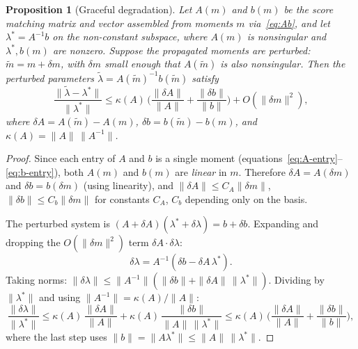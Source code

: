 \documentclass[10pt,a4paper]{amsart}
\newtheorem{proposition}{Proposition}
\begin{document}
\begin{proposition}[Graceful degradation]\label{prop:graceful}
Let $A(m)$ and $b(m)$ be the score matching matrix and vector
assembled from moments $m$ via~\eqref{eq:Ab},
and let $\lambda^* = A^{-1}b$ on the non-constant subspace, where
$A(m)$ is nonsingular and $\lambda^*, b(m)$ are nonzero.
Suppose the propagated moments are perturbed:
$\tilde{m} = m + \delta m$, with $\delta m$ small enough that
$A(\tilde m)$ is also nonsingular.
Then the perturbed parameters $\tilde{\lambda} = A(\tilde{m})^{-1} b(\tilde{m})$
satisfy
\begin{equation}
    \frac{\|\tilde\lambda - \lambda^*\|}{\|\lambda^*\|}
    \le \kappa(A)\,
    \biggl(\frac{\|\delta A\|}{\|A\|} + \frac{\|\delta b\|}{\|b\|}\biggr)
    + O(\|\delta m\|^2),
\end{equation}
where $\delta A = A(\tilde{m}) - A(m)$,
$\delta b = b(\tilde{m}) - b(m)$,
and $\kappa(A) = \|A\|\,\|A^{-1}\|$.
\end{proposition}

\begin{proof}
Since each entry of $A$ and $b$ is a single moment
(equations~\eqref{eq:A-entry}--\eqref{eq:b-entry}),
both $A(m)$ and $b(m)$ are \emph{linear} in $m$.
Therefore $\delta A = A(\delta m)$ and $\delta b = b(\delta m)$
(using linearity), and
$\|\delta A\| \le C_A \|\delta m\|$,
$\|\delta b\| \le C_b \|\delta m\|$
for constants $C_A$, $C_b$ depending only on the basis.

The perturbed system is $(A + \delta A)(\lambda^* + \delta\lambda) = b + \delta b$.
Expanding and dropping the $O(\|\delta m\|^2)$ term $\delta A \cdot \delta\lambda$:
\begin{equation}
    \delta\lambda = A^{-1}(\delta b - \delta A\, \lambda^*).
\end{equation}
Taking norms:
$\|\delta\lambda\| \le \|A^{-1}\|(\|\delta b\| + \|\delta A\|\,\|\lambda^*\|)$.
Dividing by $\|\lambda^*\|$ and using $\|A^{-1}\| = \kappa(A)/\|A\|$:
\begin{equation}
    \frac{\|\delta\lambda\|}{\|\lambda^*\|}
    \le \kappa(A)\,\frac{\|\delta A\|}{\|A\|}
    + \kappa(A)\,\frac{\|\delta b\|}{\|A\|\,\|\lambda^*\|}
    \le \kappa(A)\,
    \biggl(\frac{\|\delta A\|}{\|A\|} + \frac{\|\delta b\|}{\|b\|}\biggr),
\end{equation}
where the last step uses $\|b\| = \|A\lambda^*\| \le \|A\|\,\|\lambda^*\|$.
\end{proof}
\end{document}
